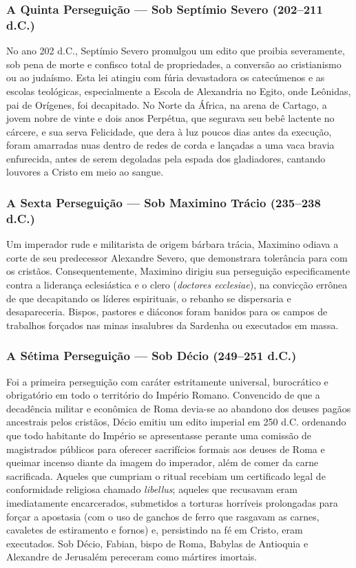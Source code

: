 \subsubsection*{A Quinta Perseguição — Sob Septímio Severo (202–211 d.C.)}
No ano 202 d.C., Septímio Severo promulgou um edito que proibia severamente, sob pena de morte e confisco total de propriedades, a conversão ao cristianismo ou ao judaísmo. Esta lei atingiu com fúria devastadora os catecúmenos e as escolas teológicas, especialmente a Escola de Alexandria no Egito, onde Leônidas, pai de Orígenes, foi decapitado. No Norte da África, na arena de Cartago, a jovem nobre de vinte e dois anos Perpétua, que segurava seu bebê lactente no cárcere, e sua serva Felicidade, que dera à luz poucos dias antes da execução, foram amarradas nuas dentro de redes de corda e lançadas a uma vaca bravia enfurecida, antes de serem degoladas pela espada dos gladiadores, cantando louvores a Cristo em meio ao sangue.


\subsubsection*{A Sexta Perseguição — Sob Maximino Trácio (235–238 d.C.)}
Um imperador rude e militarista de origem bárbara trácia, Maximino odiava a corte de seu predecessor Alexandre Severo, que demonstrara tolerância para com os cristãos. Consequentemente, Maximino dirigiu sua perseguição especificamente contra a liderança eclesiástica e o clero (\textit{doctores ecclesiae}), na convicção errônea de que decapitando os líderes espirituais, o rebanho se dispersaria e desapareceria. Bispos, pastores e diáconos foram banidos para os campos de trabalhos forçados nas minas insalubres da Sardenha ou executados em massa.


\subsubsection*{A Sétima Perseguição — Sob Décio (249–251 d.C.)}
Foi a primeira perseguição com caráter estritamente universal, burocrático e obrigatório em todo o território do Império Romano. Convencido de que a decadência militar e econômica de Roma devia-se ao abandono dos deuses pagãos ancestrais pelos cristãos, Décio emitiu um edito imperial em 250 d.C. ordenando que todo habitante do Império se apresentasse perante uma comissão de magistrados públicos para oferecer sacrifícios formais aos deuses de Roma e queimar incenso diante da imagem do imperador, além de comer da carne sacrificada. Aqueles que cumpriam o ritual recebiam um certificado legal de conformidade religiosa chamado \textit{libellus}; aqueles que recusavam eram imediatamente encarcerados, submetidos a torturas horríveis prolongadas para forçar a apostasia (com o uso de ganchos de ferro que rasgavam as carnes, cavaletes de estiramento e fornos) e, persistindo na fé em Cristo, eram executados. Sob Décio, Fabian, bispo de Roma, Babylas de Antioquia e Alexandre de Jerusalém pereceram como mártires imortais.


